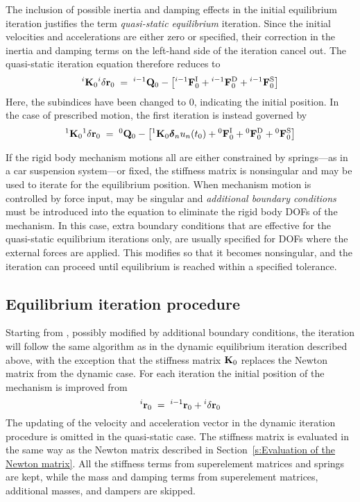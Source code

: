 The inclusion of possible inertia and damping effects in the initial equilibrium
iteration justifies the term {\it quasi-static equilibrium} iteration.
Since the initial velocities and accelerations are either zero or specified,
their correction in the inertia and damping terms on the left-hand side of the
iteration  cancel out.
The quasi-static iteration equation therefore reduces to
%
\begin{equation}
{}^{i}{\bf K}_0 {}^{i}\delta{\bf r}_0 \;=\; {}^{i-1}{\bf Q}_0 - \left[
{}^{i-1}{\bf F}^{\rm I}_0 + {}^{i-1}{\bf F}^{\rm D}_0 + {}^{i-1}{\bf F}^{\rm S}_0 \right]
\label{eq:QSE}
\end{equation}
%
Here, the subindices have been changed to $0$, indicating the initial position.
In the case of prescribed motion, the first iteration is instead governed by
%
\begin{equation}
{}^1{\bf K}_0 {}^1\delta{\bf r}_0 \;=\; {}^0{\bf Q}_0 - \left[
{}^1{\bf K}_0 {\mbox{\boldmath $\delta$}}_n u_n(t_0) + {}^0{\bf F}^{\rm I}_0 + {}^0{\bf F}^{\rm D}_0 + {}^0{\bf F}^{\rm S}_0 \right]
\end{equation}

If the rigid body mechanism motions all are either constrained by springs---as
in a car suspension system---or fixed, the stiffness matrix is nonsingular and
 may be used to iterate for the equilibrium position.
When mechanism motion is controlled by force input,  may
be singular and {\it additional boundary conditions} must be introduced
into the equation to eliminate the rigid body DOFs of the mechanism.
In this case, extra boundary conditions that are effective for the quasi-static
equilibrium iterations only, are usually specified for DOFs where the external
forces are applied.
This modifies  so that it becomes nonsingular, and the
iteration can proceed until equilibrium is reached within a specified tolerance.

\clearpage
\subsection{Equilibrium iteration procedure}

Starting from , possibly modified by additional boundary
conditions, the iteration will follow the same algorithm as in the dynamic
equilibrium iteration described above, with the exception that the stiffness
matrix ${\bf K}_0$ replaces the Newton matrix from the dynamic case.
For each iteration the initial position of the mechanism is improved from
%
\begin{equation}
{}^{i}{\bf r}_0 \;=\; {}^{i-1}{\bf r}_0 + {}^{i}\delta{\bf r}_0
\end{equation}
%
The updating of the velocity and acceleration vector in the dynamic iteration
procedure is omitted in the quasi-static case.
The stiffness matrix is evaluated in the same way as the Newton matrix described
in Section~\ref{s:Evaluation of the Newton matrix}.
All the stiffness terms from superelement matrices and springs are kept,
while the mass and damping terms from superelement matrices, additional masses,
and dampers are skipped.

